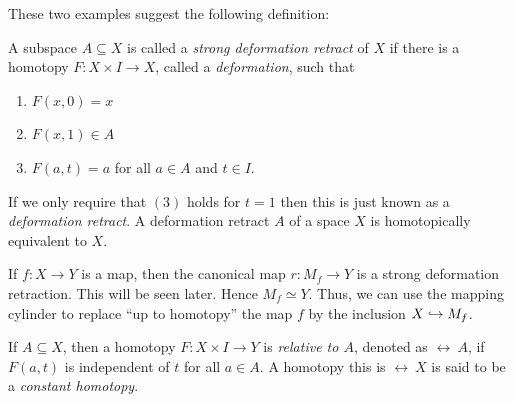 \documentclass[letterpaper, 11pt, oneside]{book}
\begin{document}
These two examples suggest the following definition:

\begin{defn}
  A subspace $A \subseteq X$ is called a \emph{strong deformation retract} of $X$ if there is a homotopy $F\colon X \times I \to X$, called a \emph{deformation}, such that
  \begin{enumerate}
  \item $F(x, 0) = x$
  \item $F(x, 1) \in A$
  \item $F(a, t) = a$ for all $a \in A$ and $t \in I$.
  \end{enumerate}
  If we only require that $(3)$ holds for $t = 1$ then this is just known as a \emph{deformation retract}.
  A deformation retract $A$ of a space $X$ is homotopically equivalent to $X$.
\end{defn}

\begin{ex}
  If $f\colon X \to Y$ is a map, then the canonical map $r\colon M_{f} \to Y$ is a strong deformation retraction.
  This will be seen later.
  Hence $M_{f} \simeq Y$.
  Thus, we can use the mapping cylinder to replace ``up to homotopy'' the map $f$ by the inclusion $X \into M_{f}$.
\end{ex}

\clearpage

\begin{defn}
  If $A \subseteq X$, then a homotopy $F\colon X \times I \to Y$ is \emph{relative to $A$}, denoted as $\rel\ A$, if $F(a, t)$ is independent of $t$ for all $a \in A$.
  A homotopy this is $\rel\ X$ is said to be a \emph{constant homotopy}.
\end{defn}
\end{document}

